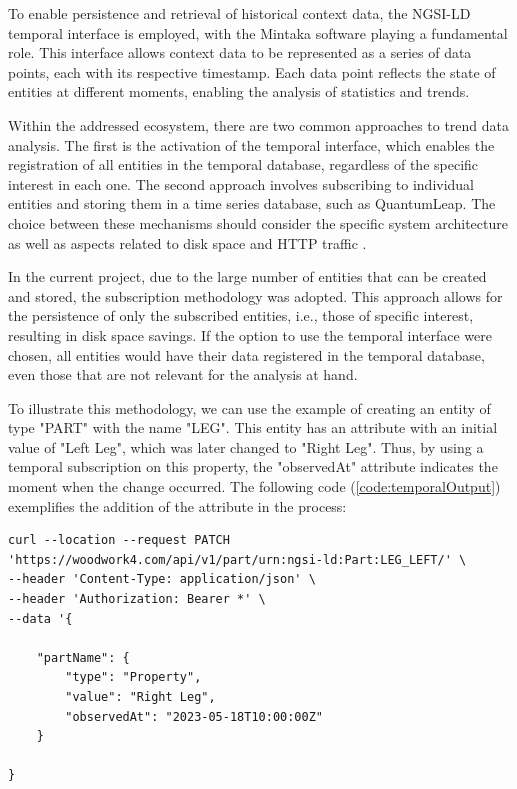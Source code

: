To enable persistence and retrieval of historical context data, the NGSI-LD temporal interface is employed, with the Mintaka software playing a fundamental role. This interface allows context data to be represented as a series of data points, each with its respective timestamp. Each data point reflects the state of entities at different moments, enabling the analysis of statistics and trends.

Within the addressed ecosystem, there are two common approaches to trend data analysis. The first is the activation of the temporal interface, which enables the registration of all entities in the temporal database, regardless of the specific interest in each one. The second approach involves subscribing to individual entities and storing them in a time series database, such as QuantumLeap. The choice between these mechanisms should consider the specific system architecture as well as aspects related to disk space and HTTP traffic \cite{fiware_temporal_nodate}.

In the current project, due to the large number of entities that can be created and stored, the subscription methodology was adopted. This approach allows for the persistence of only the subscribed entities, i.e., those of specific interest, resulting in disk space savings. If the option to use the temporal interface were chosen, all entities would have their data registered in the temporal database, even those that are not relevant for the analysis at hand.

To illustrate this methodology, we can use the example of creating an entity of type "PART" with the name "LEG". This entity has an attribute with an initial value of "Left Leg", which was later changed to "Right Leg". Thus, by using a temporal subscription on this property, the "observedAt" attribute indicates the moment when the change occurred. The following code (\ref{code:temporalOutput}) exemplifies the addition of the attribute in the process:

\begin{lstlisting}[style=linux, label={code:temporalInput}, captionpos=b,  caption={Neste exemplo, é feita uma solicitação PATCH para atualizar a entidade "Part" com o identificador "LEG". O atributo "partName" é alterado para "Right Leg" e o atributo "observedAt" é adicionado com o valor "2023-05-18T10:00:00Z", indicando o momento em que a alteração ocorreu.}]
curl --location --request PATCH 'https://woodwork4.com/api/v1/part/urn:ngsi-ld:Part:LEG_LEFT/' \
--header 'Content-Type: application/json' \
--header 'Authorization: Bearer *' \
--data '{
      
    "partName": {
        "type": "Property",
        "value": "Right Leg",
        "observedAt": "2023-05-18T10:00:00Z"
    }
   
}
\end{lstlisting}


